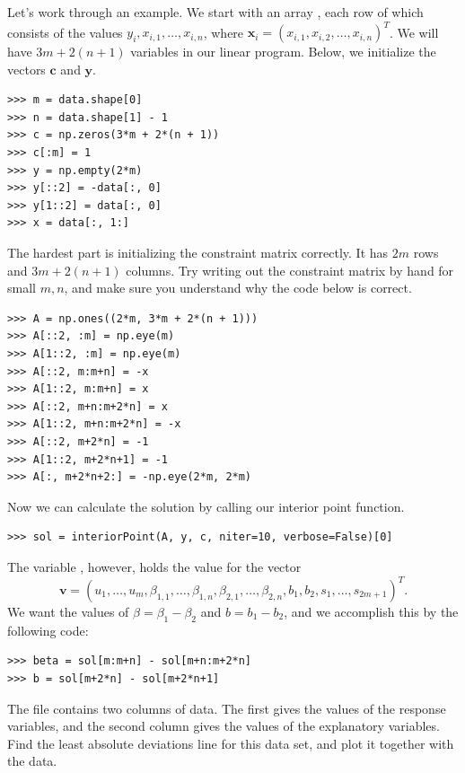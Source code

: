 Let's work through an example. We start with an array , each row of which consists of the values $y_i, x_{i,1},\ldots,x_{i,n}$,
where $\mathbf{x}_i = (x_{i,1}, x_{i,2}, \ldots, x_{i,n})^T$. We will have $3m + 2(n+1)$ variables in our linear program. Below, we initialize
the vectors $\mathbf{c}$ and $\mathbf{y}$.
\begin{lstlisting}
>>> m = data.shape[0]
>>> n = data.shape[1] - 1
>>> c = np.zeros(3*m + 2*(n + 1))
>>> c[:m] = 1
>>> y = np.empty(2*m)
>>> y[::2] = -data[:, 0]
>>> y[1::2] = data[:, 0]
>>> x = data[:, 1:]
\end{lstlisting}

The hardest part is initializing the constraint matrix correctly. It has $2m$ rows and $3m + 2(n+1)$ columns. Try writing out the
constraint matrix by hand for small $m, n$, and make sure you understand why the code below is correct.
\begin{lstlisting}
>>> A = np.ones((2*m, 3*m + 2*(n + 1)))
>>> A[::2, :m] = np.eye(m)
>>> A[1::2, :m] = np.eye(m)
>>> A[::2, m:m+n] = -x
>>> A[1::2, m:m+n] = x
>>> A[::2, m+n:m+2*n] = x
>>> A[1::2, m+n:m+2*n] = -x
>>> A[::2, m+2*n] = -1
>>> A[1::2, m+2*n+1] = -1
>>> A[:, m+2*n+2:] = -np.eye(2*m, 2*m)
\end{lstlisting}

Now we can calculate the solution by calling our interior point function.
\begin{lstlisting}
>>> sol = interiorPoint(A, y, c, niter=10, verbose=False)[0]
\end{lstlisting}

The variable , however, holds the value for the vector
\[
\mathbf{v} = (u_1,\ldots, u_m, \beta_{1,1},\ldots, \beta_{1,n}, \beta_{2,1},\ldots, \beta_{2,n}, b_1, b_2, s_1,\ldots,s_{2m+1})^T.
\]
We want the values of $\beta = \beta_1-\beta_2$ and $b = b_1 - b_2$, and we accomplish this by the
following code:
\begin{lstlisting}
>>> beta = sol[m:m+n] - sol[m+n:m+2*n]
>>> b = sol[m+2*n] - sol[m+2*n+1]
\end{lstlisting}

\begin{problem}
The file  contains two columns of data. The first gives the values of the response
variables, and the second column gives the values of the explanatory variables. Find the least absolute
deviations line for this data set, and plot it together with the data.
\end{problem} 